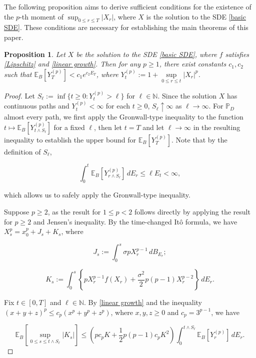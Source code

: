 \documentclass[10pt,reqno,final]{amsart}
\theoremstyle{plain}
\newtheorem{proposition}{Proposition}[section]
\theoremstyle{definition}
\theoremstyle{remark}
\numberwithin{equation}{section}
\numberwithin{figure}{section}
\numberwithin{table}{section}
\begin{document}
The following proposition aims to derive sufficient conditions for the existence of the \( p \)-th moment of \( \sup_{0 \leq r \leq T} |X_r| \), where \( X \) is the solution to the SDE \cref{basic SDE}. These conditions are necessary for establishing the main theorems of this paper.
\begin{proposition}\label{main pro1}
	Let \( X \) be the solution to the SDE \cref{basic SDE}, where \( f \) satisfies \cref{Lipschitz} and \cref{linear growth}. Then for any \( p \ge 1 \), there exist constants \( c_1, c_2 \) such that \( \mathbb{E}_{B}[Y_T^{(p)}] < c_1 e^{c_2E_T } \), where \( Y_t^{(p)} := 1 + \sup\limits_{0 \le r \le t} |X_r|^p \).
\end{proposition}
\begin{proof}
	Let \( S_{\ell} := \inf\{ t \geq 0 : Y_{t}^{(p)} > \ell \} \) for \( \ell \in \mathbb{N} \). Since the solution \( X \) has continuous paths and \( Y_{t}^{(p)} < \infty \) for each \( t \geq 0 \), \( S_{\ell} \uparrow \infty \) as \( \ell \to \infty \). For \( \mathbb{P}_D \) almost every path, we first apply the Gronwall-type inequality to the function \( t \mapsto \mathbb{E}_B[Y_{t \wedge S_{\ell}}^{(p)}] \) for a fixed \( \ell \), then let \( t = T \) and let \( \ell \to \infty \) in the resulting inequality to establish the upper bound for \( \mathbb{E}_B[Y_T^{(p)}] \). Note that by the definition of \( S_{\ell} \),
	
	
	\[
	\int_{0}^{t} \mathbb{E}_B[Y_{r \wedge S_{\ell}}^{(p)}] \, dE_r \leq \ell E_t < \infty,
	\]
	
	
	which allows us to safely apply the Gronwall-type inequality.
	
	Suppose \( p \geq 2 \), as the result for \( 1 \leq p < 2 \) follows directly by applying the result for \( p \geq 2 \) and Jensen's inequality. By the time-changed Itô formula, we have \( X_s^p = x_0^p + J_s + K_s \), where
	
	
	\[
	J_s := \int_0^s \sigma p X_r^{p-1} \, dB_{E_r};
	\]
	
	
	
	
	\[
	K_s := \int_0^s \left\{ p X_r^{p-1} f(X_r) + \frac{\sigma^2}{2} p (p-1) X_r^{p-2} \right\} \, dE_r.
	\]
	
	
	Fix \( t \in [0, T] \) and \( \ell \in \mathbb{N} \). By \cref{linear growth} and the inequality \( (x + y + z)^p \leq c_p (x^p + y^p + z^p) \), where \( x, y, z \geq 0 \) and \( c_p = 3^{p-1} \), we have
	
	
	\[
	\mathbb{E}_B\left[ \sup_{0 \leq s \leq t \wedge S_{\ell}} |K_s| \right] \leq \left( p c_p K + \frac{1}{2} p(p-1) c_p K^2 \right) \int_0^{t \wedge S_{\ell}} \mathbb{E}_B[Y_r^{(p)}] \, dE_r.
	\]
	

\end{proof}
\end{document}

